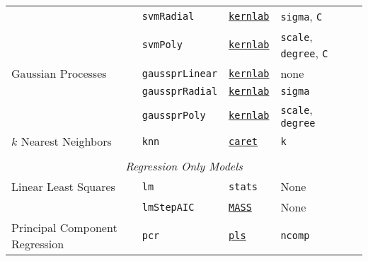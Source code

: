 \documentclass[12pt]{article}
\begin{document}
\begin{landscape}
\begin{longtable}{lllll}
  &
         \texttt{svmRadial} & 
            {\tt \href{http://cran.r-project.org/web/packages/kernlab/index.html}{kernlab}}      & 
            \texttt{sigma}, \texttt{C} \\             
      
  &
         \texttt{svmPoly} & 
            {\tt \href{http://cran.r-project.org/web/packages/kernlab/index.html}{kernlab}}      & 
            \texttt{scale}, \texttt{degree}, \texttt{C} \\            

\rowcolor[rgb]{.95, .95, .95}         
           Gaussian Processes  &
         \texttt{gaussprLinear} & 
            {\tt \href{http://cran.r-project.org/web/packages/kernlab/index.html}{kernlab}}      & 
            none \\             
            
\rowcolor[rgb]{.95, .95, .95}               
  &
         \texttt{gaussprRadial} & 
             {\tt \href{http://cran.r-project.org/web/packages/kernlab/index.html}{kernlab}}        & 
            \texttt{sigma} \\              

\rowcolor[rgb]{.95, .95, .95}               
  &
         \texttt{gaussprPoly} & 
             {\tt \href{http://cran.r-project.org/web/packages/kernlab/index.html}{kernlab}}       & 
            \texttt{scale}, \texttt{degree} \\            

                      
      $k$ Nearest Neighbors &
         \texttt{knn} & 
             {\tt \href{http://cran.r-project.org/web/packages/caret/index.html}{caret}}       & 
            \texttt{k} \\   
      
      \\
\multicolumn{5}{c}{{{ \em Regression Only Models}}} \\      
    
\rowcolor[rgb]{.95, .95, .95}             
      Linear Least Squares &
         \texttt{lm} & 
            \texttt{stats}       & 
            None \\  
            
\rowcolor[rgb]{.95, .95, .95}                     
            &
         \texttt{lmStepAIC} & 
             {\tt \href{http://cran.r-project.org/web/packages/MASS/index.html}{MASS}}       & 
            None \\  

       Principal Component Regression&
         \texttt{pcr} & 
             {\tt \href{http://cran.r-project.org/web/packages/pls/index.html}{pls}}      & 
            \texttt{ncomp}  \\  
           

\end{longtable}
\end{landscape}
\end{document}
